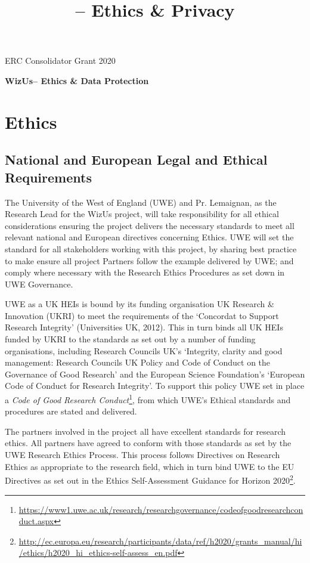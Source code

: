 \documentclass[11pt,a4paper]{report}
\title{\project -- Ethics \& Privacy}
\newcommand{\project}{WizUs\xspace}
\begin{document}
\begin{center}
    ERC Consolidator Grant 2020

    \vspace{2cm}

    \textbf{\LARGE \project -- Ethics \& Data Protection}

    \vspace{2cm}

\end{center}

\section{Ethics}

\subsection{National and European Legal and Ethical Requirements}

The University of the West of England (UWE) and Pr. Lemaignan,  as the Research
Lead for the \project project, will take responsibility for all ethical
considerations ensuring the project delivers the necessary standards to meet all
relevant national and European directives concerning Ethics. UWE will set the
standard for all stakeholders working with this project, by sharing best
practice to make ensure all project Partners follow the example delivered by
UWE; and comply where necessary with the Research Ethics Procedures as set down
in UWE Governance. 

UWE as a UK HEIs is bound by its funding organisation UK Research \& Innovation
(UKRI) to meet the requirements of the `Concordat to Support Research Integrity'
(Universities UK, 2012). This in turn binds all UK HEIs funded by UKRI to the
standards as set out by a number of funding organisations, including Research
Councils UK's `Integrity, clarity and good management: Research Councils UK
Policy and Code of Conduct on the Governance of Good Research' and the European
Science Foundation's `European Code of Conduct for Research Integrity'.  To
support this policy UWE set in place a \emph{Code of Good Research
Conduct}\footnote{\url{https://www1.uwe.ac.uk/research/researchgovernance/codeofgoodresearchconduct.aspx}}, from which
UWE's Ethical standards and procedures are stated and delivered.

\vspace{2em}

The partners involved in the project all have excellent standards for research
ethics. All partners have agreed to conform with those standards as set by the
UWE Research Ethics Process.  This process follows Directives on Research Ethics
as appropriate to the research field, which in turn bind UWE to the EU
Directives as set out in the Ethics Self-Assessment Guidance for Horizon
2020\footnote{\url{http://ec.europa.eu/research/participants/data/ref/h2020/grants_manual/hi/ethics/h2020_hi_ethics-self-assess_en.pdf}}.
\end{document}
